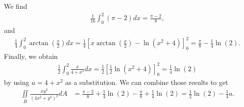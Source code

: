 \documentclass{article}
\newcommand{\di}{\iint\limits}
\begin{document}
We find 
\begin{align*}
  \frac{1}{16}\int_0^2 (\pi-2)dx = \frac{\pi-2}{8},
\end{align*}
and
\begin{align*}
  \frac{1}{4}\int_0^2 \arctan\left(\frac{x}{2}\right)dx
  =\frac{1}{4}\left[x\arctan\left(\frac{x}{2}\right)
  -\ln (x^2+4)\right]^2_0=
  \frac{\pi}{8}-\frac{1}{4}\ln(2).
\end{align*}
Finally, we obtain
\begin{align*}
  \frac{1}{2}\int_0^2\frac{x}{4+x^2}dx=\frac{1}{2}\left[\frac{1}{2}\ln(x^2+4)\right]_0^2=\frac{1}{4}\ln(2)
\end{align*}
by using $u=4+x^2$ as a substitution. We can combine those results
to get
\begin{align*}
  \di_R\frac{xy^2}{(4x^2+y^2)^2}dA
  &=\frac{\pi-2}{8}+\frac{1}{4}\ln(2)-\frac{\pi}{8}+\frac{1}{4}\ln(2)
  =\frac{1}{2}\ln(2)-\frac{1}{4}   a.
\end{align*}
\end{document}
